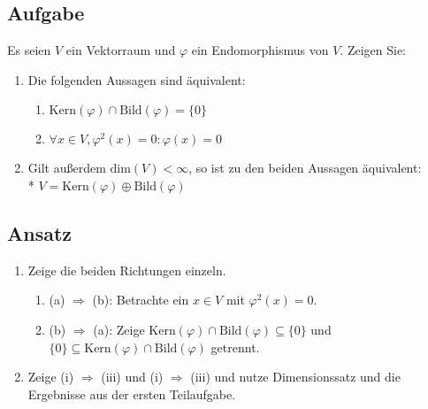 \subsection{Aufgabe}
Es seien \( V \) ein Vektorraum und \( \varphi \) ein Endomorphismus von \( V \). Zeigen Sie:
\begin{enumerate}
	\item Die folgenden Aussagen sind äquivalent:
	\begin{enumerate}
	 	\item \( \text{Kern}(\varphi) \cap \text{Bild}(\varphi) = \{ 0 \} \) 
	 	\item \( \forall x \in V, \varphi^2(x) = 0: \varphi(x) = 0 \)
	 \end{enumerate} 

	 \item Gilt außerdem \( \text{dim}(V) < \infty \), so ist zu den beiden Aussagen äquivalent: \\*
	 	\( V = \text{Kern}(\varphi) \oplus \text{Bild}(\varphi) \)
\end{enumerate}

\subsection{Ansatz}
\begin{enumerate}
	\item Zeige die beiden Richtungen einzeln.
	\begin{enumerate}
	 	\item (a) \( \Rightarrow \) (b): Betrachte ein \( x \in V \) mit \( \varphi^2(x) = 0 \).
	 	\item (b) \( \Rightarrow \) (a): Zeige \( \text{Kern}(\varphi) \cap \text{Bild}(\varphi) \subseteq \{ 0 \} \) und \( \{ 0 \} \subseteq \text{Kern}(\varphi) \cap \text{Bild}(\varphi) \) getrennt.
	 \end{enumerate} 

	 \item Zeige (i) \( \Rightarrow \) (iii) und (i) \( \Rightarrow \) (iii) und nutze Dimensionssatz und die Ergebnisse aus der ersten Teilaufgabe.
\end{enumerate}


